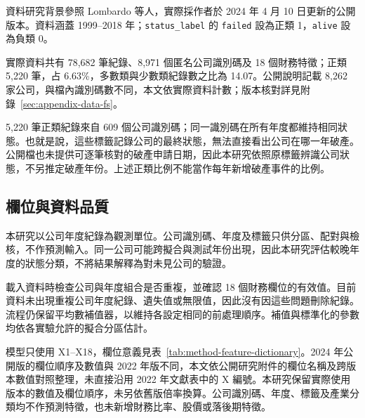 資料研究背景參照 Lombardo 等人\autocite{lombardo2022bankruptcy}，實際採作者於 2024 年 4 月 10 日更新的公開版本\autocite{sowide-bankruptcy-data}。資料涵蓋 1999--2018 年；\nolinkurl{status_label} 的 \nolinkurl{failed} 設為正類 1，\nolinkurl{alive} 設為負類 0。

實際資料共有 78,682 筆紀錄、8,971 個匿名公司識別碼及 18 個財務特徵；正類 5,220 筆，占 6.63\%，多數類與少數類紀錄數之比為 14.07。公開說明記載 8,262 家公司，與檔內識別碼數不同，本文依實際資料計數；版本核對詳見附錄~\ref{sec:appendix-data-fs}。

5,220 筆正類紀錄來自 609 個公司識別碼；同一識別碼在所有年度都維持相同狀態。也就是說，這些標籤記錄公司的最終狀態，無法直接看出公司在哪一年破產。公開檔也未提供可逐筆核對的破產申請日期，因此本研究依照原標籤辨識公司狀態，不另推定破產年份。上述正類比例不能當作每年新增破產事件的比例。

\subsection{欄位與資料品質}

本研究以公司年度紀錄為觀測單位。公司識別碼、年度及標籤只供分區、配對與檢核，不作預測輸入。同一公司可能跨擬合與測試年份出現，因此本研究評估較晚年度的狀態分類，不將結果解釋為對未見公司的驗證。

載入資料時檢查公司與年度組合是否重複，並確認 18 個財務欄位的有效值。目前資料未出現重複公司年度紀錄、遺失值或無限值，因此沒有因這些問題刪除紀錄。流程仍保留平均數補值器，以維持各設定相同的前處理順序。補值與標準化的參數均依各實驗允許的擬合分區估計。

模型只使用 X1--X18，欄位意義見表~\ref{tab:method-feature-dictionary}。2024 年公開版的欄位順序及數值與 2022 年版不同，本文依公開研究附件的欄位名稱及跨版本數值對照整理，未直接沿用 2022 年文獻表中的 X 編號\autocite{sowide-financial-supplement}。本研究保留實際使用版本的數值及欄位順序，未另依舊版倍率換算。公司識別碼、年度、標籤及產業分類均不作預測特徵，也未新增財務比率、股價或落後期特徵。

